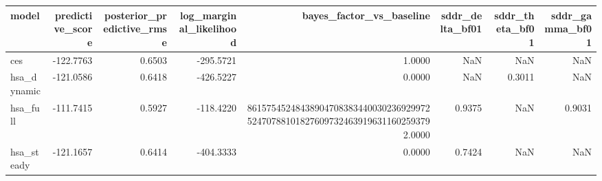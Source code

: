 \begin{tabular}{lrrrrrrr}
\toprule
model & predictive\_score & posterior\_predictive\_rmse & log\_marginal\_likelihood & bayes\_factor\_vs\_baseline & sddr\_delta\_bf01 & sddr\_theta\_bf01 & sddr\_gamma\_bf01 \\
\midrule
ces & -122.7763 & 0.6503 & -295.5721 & 1.0000 & NaN & NaN & NaN \\
hsa\_dynamic & -121.0586 & 0.6418 & -426.5227 & 0.0000 & NaN & 0.3011 & NaN \\
hsa\_full & -111.7415 & 0.5927 & -118.4220 & 86157545248438904708383440030236929972524707881018276097324639196311602593792.0000 & 0.9375 & NaN & 0.9031 \\
hsa\_steady & -121.1657 & 0.6414 & -404.3333 & 0.0000 & 0.7424 & NaN & NaN \\
\bottomrule
\end{tabular}
